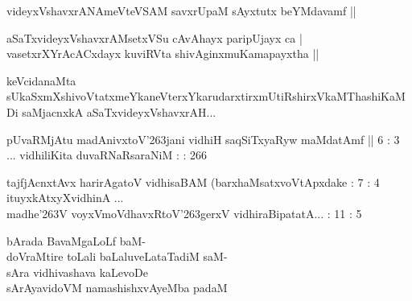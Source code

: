 \begin{entry}
\begin{shl}
videyxVshavxrANAmeVteVSAM savxrUpaM sAyxtutx beYMdavamf ||
\end{shl}
\begin{shl}
aSaTxvideyxVshavxrAMsetxVSu cAvAhayx paripUjayx ca |\\
vasetxrXYrAcACxdayx kuviRVta shivAginxmuKamapayxtha ||
\end{shl}
\begin{shl}
keVcidanaMta sUkaSxmXshivoVtatxmeYkaneVterxYkarudarxtirxmUtiRshirxVkaMThashiKaMDi saMjacnxkA aSaTxvideyxVshavxrAH...
\end{shl}
\end{entry}

\begin{entry}
\gl{}
\info{}{}{}{}
\begin{shl}
pUvaRMjAtu madAnivxtoV\char'263jani vidhiH saqSiTxyaRyw maMdatAmf || 6 : 3\\
... vidhiliKita duvaRNaRsaraNiM : : 266
\end{shl}
\gl{}
\info{}{}{}{}
\begin{shl}
tajfjAcnxtAvx harirAgatoV vidhisaBAM (barxhaMsatxvoVtApxdake : 7 : 4\\
ituyxkAtxyXvidhinA ... \\
madhe\char'263V voyxVmoVdhavxRtoV\char'263gerxV vidhiraBipatatA... : 11 : 5
\end{shl}

\begin{shl}
bArada BavaMgaLoLf baM-\\
doVraMtire toLali baLaluveLataTadiM saM-\\
sAra vidhivashava kaLevoDe\\
sArAyavidoVM namashishxvAyeMba padaM
\end{shl}
\end{entry}

\begin{entry}
\end{entry}


